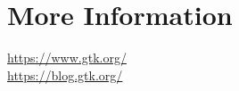 \documentclass[a4paper,notumble]{leaflet}
\begin{document}
%
%

\section{More Information}

\url{https://www.gtk.org/}\\
\url{https://blog.gtk.org/}
\end{document}
